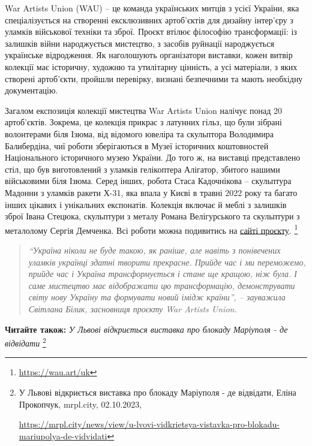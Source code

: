 War Artists Union (WAU) – це команда українських митців з усієї України, яка
спеціалізується на створенні ексклюзивних артоб'єктів для дизайну інтер'єру з
уламків військової техніки та зброї. Проєкт втілює філософію трансформації: із
залишків війни народжується мистецтво, з засобів руйнації народжується
українське відродження. Як наголошують організатори виставки, кожен витвір
колекції має історичну, художню та утилітарну цінність, а усі матеріали, з яких
створені артоб'єкти,  пройшли перевірку, визнані безпечними та мають необхідну
документацію.


Загалом експозиція колекції мистецтва War Artists Union налічує понад 20
артоб'єктів. Зокрема, це колекція прикрас з латунних гільз, що були зібрані
волонтерами біля Ізюма, від відомого ювеліра та скульптора Володимира
Балибердіна, чиї роботи зберігаються в Музеї історичних коштовностей
Національного історичного музею України. До того ж, на виставці представлено
стіл, що був виготовлений з уламків гелікоптера Алігатор, збитого нашими
військовими біля Ізюма. Серед інших, робота Стаса Кадочнікова – скульптура
Мадонни з уламків ракети Х-31, яка впала у Києві в травні 2022 року та багато
інших цікавих і унікальних експонатів. Колекція включає й меблі з залишків
зброї Івана Стецюка, скульптури з металу Романа Велігурського та скульптури з
металолому Сергія Демченка. Всі роботи можна подивитись на \href{https://wau.art/uk/}{сайті проєкту}.
\footnote{\url{https://wau.art/uk}}

\begin{quote}
\em\enquote{Україна ніколи не буде такою, як раніше, але навіть з понівечених уламків
українці здатні творити прекрасне. Прийде час і ми переможемо, прийде час і
Україна трансформується і стане ще кращою, ніж була. І саме мистецтво має
відображати цю трансформацію, демонструвати світу нову Україну та формувати
новий імідж країни}, – зауважила Світлана Білик, засновниця проєкту  War
Artists Union. 	
\end{quote}

\textbf{Читайте також:} \emph{У Львові відкриється виставка про блокаду Маріуполя - де відвідати}%
\footnote{У Львові відкриється виставка про блокаду Маріуполя - де відвідати, Еліна Прокопчук, mrpl.city, 02.10.2023, \par%
\url{https://mrpl.city/news/view/u-lvovi-vidkrietsya-vistavka-pro-blokadu-mariupolya-de-vidvidati}
}


